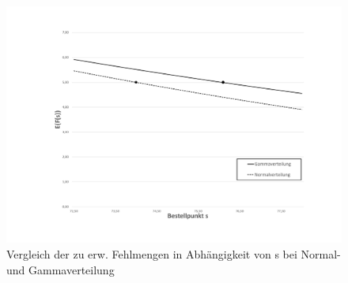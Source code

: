 \begin{figure}
	\centering
	\includegraphics[width=\textwidth,trim=3.7cm 1.5cm 3.3cm 1.5cm, clip=true]{./Bilder/VerteilungsfunktionenVerg.pdf}
	\caption{Vergleich der zu erw. Fehlmengen in Abhängigkeit von s bei Normal- und Gammaverteilung}
	\label{img:vergleich}
\end{figure}